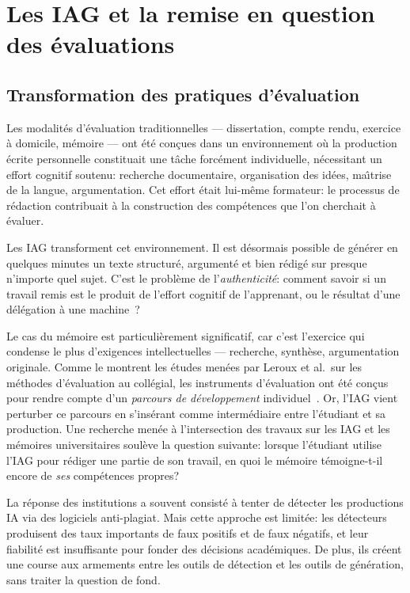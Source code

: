 \section{Les IAG et la remise en question des \'evaluations}\label{sec:remise}

\subsection{Transformation des pratiques d'\'evaluation}

Les modalit\'es d'\'evaluation traditionnelles --- dissertation, compte rendu, exercice \`a domicile, m\'emoire --- ont \'et\'e con\c{c}ues dans un environnement o\`u la production \'ecrite personnelle constituait une t\^ache forc\'ement individuelle, n\'ecessitant un effort cognitif soutenu: recherche documentaire, organisation des id\'ees, ma\^\i trise de la langue, argumentation. 
Cet effort \'etait lui-m\^eme formateur: le processus de r\'edaction contribuait \`a la construction des comp\'etences que l'on cherchait \`a \'evaluer.

Les IAG transforment cet environnement. 
Il est d\'esormais possible de g\'en\'erer en quelques minutes un texte structur\'e, argument\'e et bien r\'edig\'e sur presque n'importe quel sujet. 
C'est le probl\`eme de l'\emph{authenticit\'e}: comment savoir si un travail remis est le produit de l'effort cognitif de l'apprenant, ou le r\'esultat d'une d\'el\'egation \`a une machine~?

Le cas du m\'emoire est particuli\`erement significatif, car c'est l'exercice qui condense le plus d'exigences intellectuelles --- recherche, synth\`ese, argumentation originale. 
Comme le montrent les \'etudes men\'ees par Leroux et al.\ sur les m\'ethodes d'\'evaluation au coll\'egial, les instruments d'\'evaluation ont \'et\'e con\c{c}us pour rendre compte d'un \emph{parcours de d\'eveloppement} individuel~\citep{leroux2015evaluer}.
Or, l'IAG vient perturber ce parcours en s'ins\'erant comme interm\'ediaire entre l'\'etudiant et sa production. 
Une recherche men\'ee \`a l'intersection des travaux sur les IAG et les m\'emoires universitaires soul\`eve la question suivante: lorsque l'\'etudiant utilise l'IAG pour r\'ediger une partie de son travail, en quoi le m\'emoire t\'emoigne-t-il encore de \emph{ses} comp\'etences propres?

La r\'eponse des institutions a souvent consist\'e \`a tenter de d\'etecter les productions IA via des logiciels anti-plagiat. 
Mais cette approche est limit\'ee: les d\'etecteurs produisent des taux importants de faux positifs et de faux n\'egatifs, et leur fiabilit\'e est insuffisante pour fonder des d\'ecisions acad\'emiques. 
De plus, ils cr\'eent une course aux armements entre les outils de d\'etection et les outils de g\'en\'eration, sans traiter la question de fond.

